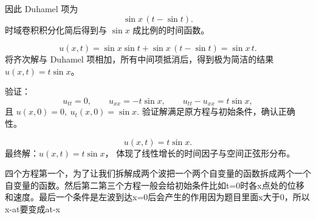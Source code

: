 \begin{solution}
\begin{dxsolution}
因此 Duhamel 项为
\[
\sin x\,(t-\sin t).
\]
\tcblower
时域卷积积分化简后得到与 $\sin x$ 成比例的时间函数。
\end{dxsolution}

\begin{dxsolution}
\[
u(x,t)=\sin x\sin t+\sin x\,(t-\sin t)
=\sin x\,t.
\]
\tcblower
将齐次解与 Duhamel 项相加，所有中间项抵消后，得到极为简洁的结果 $u(x,t)=t\sin x$。
\end{dxsolution}

\begin{dxsolution}
验证：
\[
u_{tt}=0,\qquad u_{xx}=-t\sin x,\qquad u_{tt}-u_{xx}=t\sin x,
\]
且 \(u(x,0)=0,\ u_t(x,0)=\sin x.\)
\tcblower
验证解满足原方程与初始条件，确认正确性。
\end{dxsolution}

\begin{dxsolution}
\[
u(x,t)=t\sin x.
\]
\tcblower
最终解：$u(x,t)=t\sin x$，  
体现了线性增长的时间因子与空间正弦形分布。
\end{dxsolution}
\end{solution}
\begin{dxtips}
    四个方程第一个，为了让我们拆解成两个波把一个两个自变量的函数拆成两个一个自变量的函数。然后第二第三个方程一般会给初始条件比如t=0时各x点处的位移和速度。最后一个条件是左波到达x=0后会产生的作用因为题目里面x大于0，所以x-at要变成at-x
\end{dxtips}
